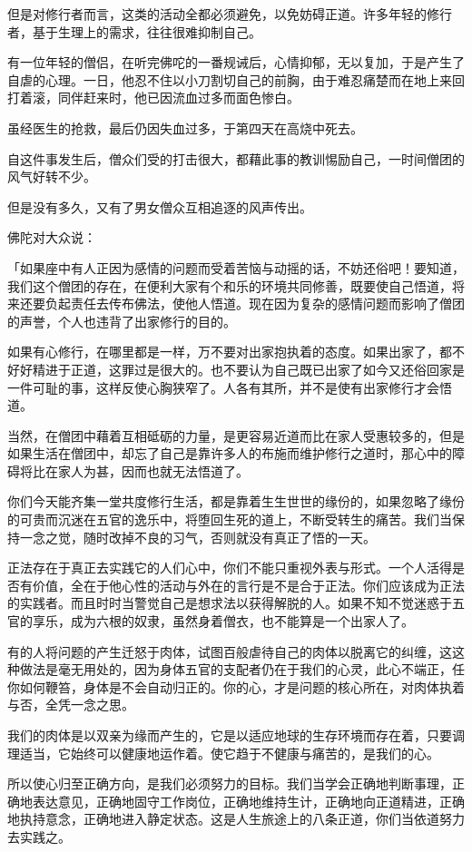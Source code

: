 \documentclass[twoside,openany]{book}
\begin{document}
但是对修行者而言，这类的活动全都必须避免，以免妨碍正道。许多年轻的修行者，基于生理上的需求，往往很难抑制自己。

有一位年轻的僧侣，在听完佛咜的一番规诫后，心情抑郁，无以复加，于是产生了自虐的心理。一日，他忍不住以小刀割切自己的前胸，由于难忍痛楚而在地上来回打着滚，同伴赶来时，他已因流血过多而面色惨白。

虽经医生的抢救，最后仍因失血过多，于第四天在高烧中死去。

自这件事发生后，僧众们受的打击很大，都藉此事的教训惕励自己，一时间僧团的风气好转不少。

但是没有多久，又有了男女僧众互相追逐的风声传出。

佛陀对大众说：

「如果座中有人正因为感情的问题而受着苦恼与动摇的话，不妨还俗吧！要知道，我们这个僧团的存在，在便利大家有个和乐的环境共同修善，既要使自己悟道，将来还要负起责任去传布佛法，使他人悟道。现在因为复杂的感情问题而影响了僧团的声誉，个人也违背了出家修行的目的。

如果有心修行，在哪里都是一样，万不要对出家抱执着的态度。如果出家了，都不好好精进于正道，这罪过是很大的。也不要认为自己既已出家了如今又还俗回家是一件可耻的事，这样反使心胸狭窄了。人各有其所，并不是使有出家修行才会悟道。

当然，在僧团中藉着互相砥砺的力量，是更容易近道而比在家人受惠较多的，但是如果生活在僧团中，却忘了自己是靠许多人的布施而维护修行之道时，那心中的障碍将比在家人为甚，因而也就无法悟道了。

你们今天能齐集一堂共度修行生活，都是靠着生生世世的缘份的，如果忽略了缘份的可贵而沉迷在五官的逸乐中，将堕回生死的道上，不断受转生的痛苦。我们当保持一念之觉，随时改掉不良的习气，否则就没有真正了悟的一天。

正法存在于真正去实践它的人们心中，你们不能只重视外表与形式。一个人活得是否有价值，全在于他心性的活动与外在的言行是不是合于正法。你们应该成为正法的实践者。而且时时当警觉自己是想求法以获得解脱的人。如果不知不觉迷惑于五官的享乐，成为六根的奴隶，虽然身着僧衣，也不能算是一个出家人了。

有的人将问题的产生迁怒于肉体，试图百般虐待自己的肉体以脱离它的纠缠，这这种做法是毫无用处的，因为身体五官的支配者仍在于我们的心灵，此心不端正，任你如何鞭笞，身体是不会自动归正的。你的心，才是问题的核心所在，对肉体执着与否，全凭一念之思。

我们的肉体是以双亲为缘而产生的，它是以适应地球的生存环境而存在着，只要调理适当，它始终可以健康地运作着。使它趋于不健康与痛苦的，是我们的心。

所以使心归至正确方向，是我们必须努力的目标。我们当学会正确地判断事理，正确地表达意见，正确地固守工作岗位，正确地维持生计，正确地向正道精进，正确地执持意念，正确地进入静定状态。这是人生旅途上的八条正道，你们当依道努力去实践之。
\end{document}

